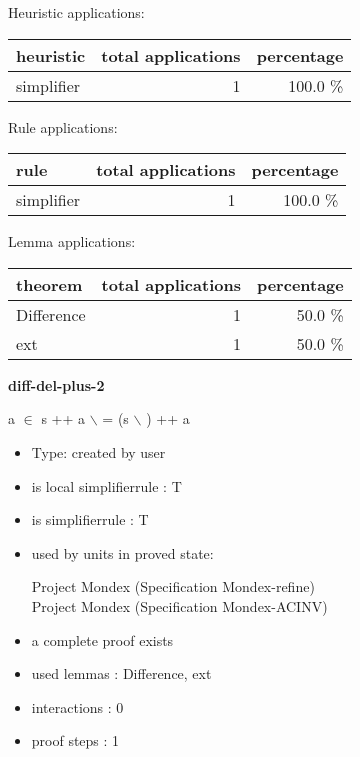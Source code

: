 \documentclass[a4paper]{article}
\begin{document}
\medskip


Heuristic applications:

\begin{supertabular}{l|r|r}
heuristic	& total applications & percentage \\ \hline
simplifier & 1 & 100.0 \% \\

\end{supertabular}

Rule applications:

\begin{supertabular}{l|r|r}
rule	        & total applications & percentage \\ \hline
simplifier & 1 & 100.0 \% \\

\end{supertabular}

Lemma applications:

\begin{supertabular}{l|r|r}
theorem	        & total applications & percentage \\ \hline
Difference & 1 & 50.0 \% \\
ext & 1 & 50.0 \% \\

\end{supertabular}
\pagebreak

{\LARGE\bf diff-del-plus-2}\label{lemma-diff-del-plus-2}

\medskip

 \Fol \Not a $\in$  \Imp s ++ a $\backslash$  = (s $\backslash$ ) ++ a

\begin{itemize}

\item Type: created by user

\item is local simplifierrule : T
\item is simplifierrule : T
\item used by units in proved state:

Project Mondex (Specification Mondex-refine) \\
Project Mondex (Specification Mondex-ACINV)
\item       a complete proof exists
\item       used lemmas  : Difference, ext
\item       interactions : 0
\item       proof steps  : 1
\end{itemize}
\end{document}
